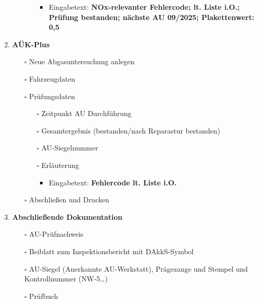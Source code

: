 \documentclass{vorlage-design-main}
\begin{document}
\begin{enumerate}
\begin{itemize}
\begin{itemize}
      \begin{itemize}

      \item
        Eingabetext: \textbf{NOx-relevanter Fehlercode; lt. Liste i.O.;
        Prüfung bestanden; nächste AU 09/2025; Plakettenwert: 0,5}
      \end{itemize}
    \end{itemize}
  \end{itemize}
\item
  \textbf{AÜK-Plus}

  \begin{itemize}

  \item[$\square$]
    Neue Abgasuntersuchung anlegen
  \item[$\square$]
    Fahrzeugdaten
  \item[$\square$]
    Prüfungsdaten

    \begin{itemize}

    \item[$\square$]
      Zeitpunkt AU Durchführung
    \item[$\square$]
      Gesamtergebnis (bestanden/nach Reparastur bestanden)
    \item[$\square$]
      AU-Siegelnummer
    \item[$\square$]
      Erläuterung

      \begin{itemize}

      \item
        Eingabetext: \textbf{Fehlercode lt. Liste i.O.}
      \end{itemize}
    \end{itemize}
  \item[$\square$]
    Abschließen und Drucken
  \end{itemize}
\item
  \textbf{Abschließende Dokumentation}

  \begin{itemize}

  \item[$\square$]
    AU-Prüfnachweis
  \item[$\square$]
    Beiblatt zum Inspektionsbericht mit DAkkS-Symbol
  \item[$\square$]
    AU-Siegel (Anerkannte AU-Werkstatt), Prägezange und Stempel und
    Kontrollnummer (NW-5\ldots)
  \item[$\square$]
    Prüfbuch
  \end{itemize}
\end{enumerate}
\end{document}
